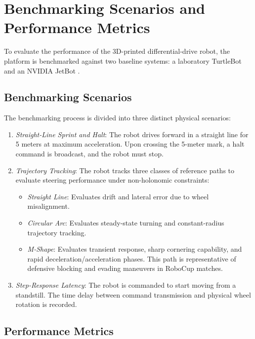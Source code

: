 \documentclass[a4paper,twoside,12pt]{report}
\begin{document}
\section{Benchmarking Scenarios and Performance Metrics}

To evaluate the performance of the 3D-printed differential-drive robot, the platform is benchmarked against two baseline systems: a laboratory TurtleBot and an NVIDIA JetBot \citep{jetbot_org}.

\subsection{Benchmarking Scenarios}

The benchmarking process is divided into three distinct physical scenarios:
\begin{enumerate}
\item \textit{Straight-Line Sprint and Halt}: The robot drives forward in a straight line for 5 meters at maximum acceleration. Upon crossing the 5-meter mark, a halt command is broadcast, and the robot must stop.
\item \textit{Trajectory Tracking}: The robot tracks three classes of reference paths to evaluate steering performance under non-holonomic constraints:
  \begin{itemize}
  \item \textit{Straight Line}: Evaluates drift and lateral error due to wheel misalignment.
  \item \textit{Circular Arc}: Evaluates steady-state turning and constant-radius trajectory tracking.
  \item \textit{M-Shape}: Evaluates transient response, sharp cornering capability, and rapid deceleration/acceleration phases. This path is representative of defensive blocking and evading maneuvers in RoboCup matches.
  \end{itemize}
\item \textit{Step-Response Latency}: The robot is commanded to start moving from a standstill. The time delay between command transmission and physical wheel rotation is recorded.
\end{enumerate}

\subsection{Performance Metrics}
\end{document}
